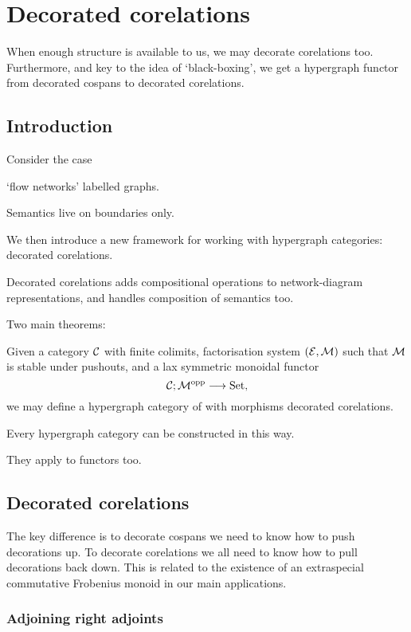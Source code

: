 \chapter{Decorated corelations}

When enough structure is available to us, we may decorate corelations too.
Furthermore, and key to the idea of `black-boxing', we get a hypergraph functor
from decorated cospans to decorated corelations.

\section{Introduction}
Consider the case

`flow networks' labelled graphs.

Semantics live on boundaries only.

We then introduce a new framework for working with hypergraph
categories: decorated corelations.

Decorated corelations adds compositional operations to network-diagram
representations, and handles composition of semantics too. 

Two main theorems: 
\begin{theorem}
Given a category $\mathcal C$ with finite colimits, factorisation system $(\mathcal E,\mathcal
M)$ such that $\mathcal M$ is stable under pushouts, and a lax symmetric monoidal functor 
\[
  \mathcal C; \mathcal M^{\mathrm{opp}} \longrightarrow \mathrm{Set},
\]
we may define a hypergraph category of with morphisms decorated corelations.
\end{theorem}

\begin{theorem}
Every hypergraph category can be constructed in this way.
\end{theorem}

They apply to functors too.

\section{Decorated corelations} \label{sec:dcorc}

The key difference is to decorate cospans we need to know how to push
decorations up. To decorate corelations we all need to know how to pull
decorations back down. This is related to the existence of an extraspecial
commutative Frobenius monoid in our main applications.



\subsection{Adjoining right adjoints}

